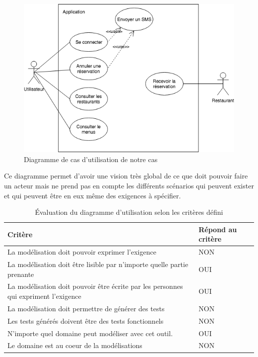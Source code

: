             \begin{figure}[H]
                \centering
                \includegraphics[width=\textwidth]{images/useeCAse.png}
                \caption{Diagramme de cas d'utilisation de notre cas}
            \end{figure}

            Ce diagramme permet d'avoir une vision très global de ce que doit pouvoir faire un acteur mais ne prend pas en compte les différents scénarios qui peuvent exister et qui peuvent être en eux même des exigences à spécifier.

        \begin{table}[H]
        \centering
         \begin{tabular}{|p{25em}|p{5em}|} 
         \hline
        Critère & Répond au critère \\ [0.5ex] 
         \hline
         La modélisation doit pouvoir exprimer l’exigence & \cellcolor[HTML]{D03737}NON\\
         \hline
        La modélisation doit être lisible par n’importe quelle partie prenante & \cellcolor[HTML]{699A73}OUI\\
         \hline
        La modélisation doit pouvoir être écrite par les personnes qui expriment l’exigence &\cellcolor[HTML]{699A73} OUI \\
         \hline
        La modélisation doit permettre de générer des tests & \cellcolor[HTML]{D03737}NON \\
         \hline
        Les tests générés doivent être des tests fonctionnels &\cellcolor[HTML]{D03737} NON\\ 
         \hline
        N’importe quel domaine peut modéliser avec cet outil.&\cellcolor[HTML]{699A73} OUI\\ 
         \hline
        Le domaine est au coeur de la modélisations &\cellcolor[HTML]{D03737} NON\\ 
        \hline 
        \end{tabular}
        \caption{Évaluation du diagramme d'utilisation selon les critères défini}
        \end{table}
    
